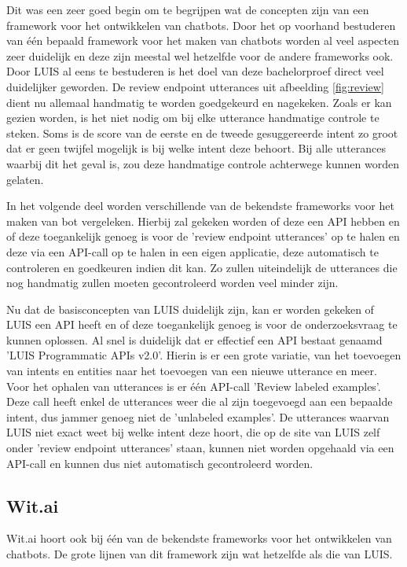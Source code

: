 Dit was een zeer goed begin om te begrijpen wat de concepten zijn van een framework voor het ontwikkelen van chatbots. Door het op voorhand bestuderen van één bepaald framework voor het maken van chatbots worden al veel aspecten zeer duidelijk en deze zijn meestal wel hetzelfde voor de andere frameworks ook. Door LUIS al eens te bestuderen is het doel van deze bachelorproef direct veel duidelijker geworden. De review endpoint utterances uit afbeelding \ref{fig:review} dient nu allemaal handmatig te worden goedgekeurd en nagekeken. Zoals er kan gezien worden, is het niet nodig om bij elke utterance handmatige controle te steken. Soms is de score van de eerste en de tweede gesuggereerde intent zo groot dat er geen twijfel mogelijk is bij welke intent deze behoort. Bij alle utterances waarbij dit het geval is, zou deze handmatige controle achterwege kunnen worden gelaten.

In het volgende deel worden verschillende van de bekendste frameworks voor het maken van bot vergeleken. Hierbij zal gekeken worden of deze een API hebben en of deze toegankelijk genoeg is voor de 'review endpoint utterances' op te halen en deze via een API-call op te halen in een eigen applicatie, deze automatisch te controleren en goedkeuren indien dit kan. Zo zullen uiteindelijk de utterances die nog handmatig zullen moeten gecontroleerd worden veel minder zijn.

Nu dat de basisconcepten van LUIS duidelijk zijn, kan er worden gekeken of LUIS een API heeft en of deze toegankelijk genoeg is voor de onderzoeksvraag te kunnen oplossen. Al snel is duidelijk dat er effectief een API bestaat genaamd 'LUIS Programmatic APIs v2.0'. Hierin is er een grote variatie, van het toevoegen van intents en entities naar het toevoegen van een nieuwe utterance en meer. Voor het ophalen van utterances is er één API-call 'Review labeled examples'. Deze call heeft enkel de utterances weer die al zijn toegevoegd aan een bepaalde intent, dus jammer genoeg niet de 'unlabeled examples'. De utterances waarvan LUIS niet exact weet bij welke intent deze hoort, die op de site van LUIS zelf onder 'review endpoint utterances' staan, kunnen niet worden opgehaald via een API-call en kunnen dus niet automatisch gecontroleerd worden.

\subsection{Wit.ai}
\label{Wit}

Wit.ai hoort ook bij één van de bekendste frameworks voor het ontwikkelen van chatbots. De grote lijnen van dit framework zijn wat hetzelfde als die van LUIS.

